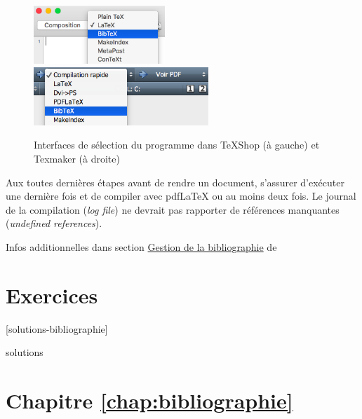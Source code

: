 \begin{figure}
  \centering
  \includegraphics[height=2.2cm]{bibtex-texshop}
  \qquad
  \includegraphics[height=2.2cm]{bibtex-texmaker}
  \caption{Interfaces de sélection du programme {\BibTeX} dans TeXShop
    (à gauche)
    et Texmaker (à droite)}
  \label{fig:bibliographie:editeurs}
\end{figure}

\begin{conseil}
  Aux toutes dernières étapes avant de rendre un document, s'assurer
  d'exécuter {\BibTeX} une dernière fois et de compiler avec
  pdf{\LaTeX} ou {\XeLaTeX} au moins deux fois. Le journal de la
  compilation (\emph{log file}) ne devrait pas rapporter de références
  manquantes (\emph{undefined references}).
\end{conseil}

Infos additionnelles dans section \href{https://fr.wikibooks.org/wiki/LaTeX/Gestion_de_la_bibliographie}{Gestion de la
  bibliographie}
de \citeauthor{wikilivres:latex}



\section{Exercices}
\label{sec:bibliographie:exercices}

[solutions-bibliographie]

\begin{Filesave}{solutions}
\section*{Chapitre \ref*{chap:bibliographie}}

\end{Filesave}


